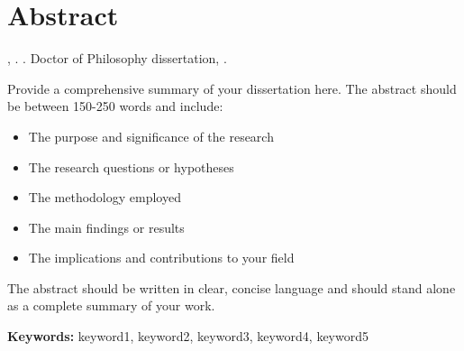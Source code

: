 \chapter*{Abstract}

\noindent
\authorname, \dissertationyear. \emph{\dissertationtitle}. Doctor of Philosophy dissertation, \universityname.

\vspace{0.5in}

Provide a comprehensive summary of your dissertation here. The abstract should be between 150-250 words and include:

\begin{itemize}
\item The purpose and significance of the research
\item The research questions or hypotheses
\item The methodology employed
\item The main findings or results
\item The implications and contributions to your field
\end{itemize}

The abstract should be written in clear, concise language and should stand alone as a complete summary of your work.

\vspace{0.5in}

\noindent
\textbf{Keywords:} keyword1, keyword2, keyword3, keyword4, keyword5

\newpage